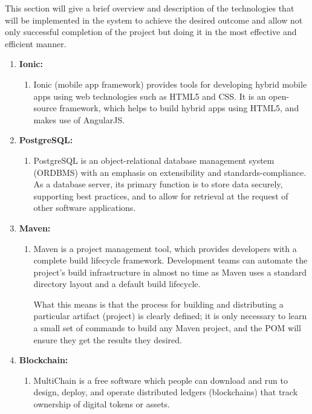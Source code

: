This section will give a brief overview and description of the technologies that will be implemented in the system to achieve the desired outcome and allow not only successful completion of the project but doing it in the most effective and efficient manner.

	\begin{enumerate}
		\item \textbf{Ionic:} 
		\begin{enumerate}
			\item[] Ionic (mobile app framework) provides tools for developing hybrid mobile apps using web technologies such as HTML5 and CSS. It is an open-source framework, which helps to build hybrid apps using HTML5, and makes use of AngularJS. 
		\end{enumerate}
		
		\item \textbf{PostgreSQL:}
		\begin{enumerate}
			\item[] PostgreSQL is an object-relational database management system (ORDBMS) with an emphasis on extensibility and standards-compliance. As a database server, its primary function is to store data securely, supporting best practices, and to allow for retrieval at the request of other software applications. 
		\end{enumerate} 
		
		\item \textbf{Maven:}
		\begin{enumerate}
			\item[] Maven is a project management tool, which provides developers with a complete build lifecycle framework. Development teams can automate the project's build infrastructure in almost no time as Maven uses a standard directory layout and a default build lifecycle.
						
			What this means is that the process for building and distributing a particular artifact (project) is clearly defined; it is only necessary to learn a small set of commands to build any Maven project, and the POM will ensure they get the results they desired.
		\end{enumerate}
		
		\item \textbf{Blockchain:}	
		\begin{enumerate}
			\item[] MultiChain is a free software which people can download and run to design, deploy, and operate distributed ledgers (blockchains) that track ownership of digital tokens or assets.
		\end{enumerate}
	\end{enumerate}